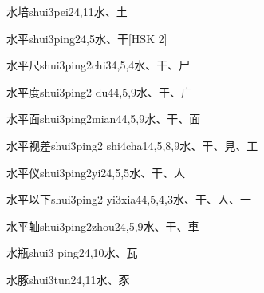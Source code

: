 \begin{entry}{水培}{shui3pei2}{4,11}{⽔、⼟}
\end{entry}

\begin{entry}{水平}{shui3ping2}{4,5}{⽔、⼲}[HSK 2]
\end{entry}

\begin{entry}{水平尺}{shui3ping2chi3}{4,5,4}{⽔、⼲、⼫}
\end{entry}

\begin{entry}{水平度}{shui3ping2 du4}{4,5,9}{⽔、⼲、⼴}
\end{entry}

\begin{entry}{水平面}{shui3ping2mian4}{4,5,9}{⽔、⼲、⾯}
\end{entry}

\begin{entry}{水平视差}{shui3ping2 shi4cha1}{4,5,8,9}{⽔、⼲、⾒、⼯}
\end{entry}

\begin{entry}{水平仪}{shui3ping2yi2}{4,5,5}{⽔、⼲、⼈}
\end{entry}

\begin{entry}{水平以下}{shui3ping2 yi3xia4}{4,5,4,3}{⽔、⼲、⼈、⼀}
\end{entry}

\begin{entry}{水平轴}{shui3ping2zhou2}{4,5,9}{⽔、⼲、⾞}
\end{entry}

\begin{entry}{水瓶}{shui3 ping2}{4,10}{⽔、⽡}
\end{entry}

\begin{entry}{水豚}{shui3tun2}{4,11}{⽔、⾗}
\end{entry}

